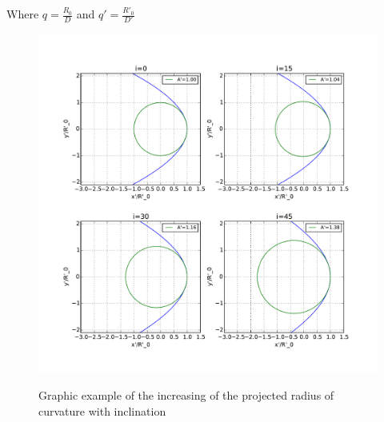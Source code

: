 Where $q=\frac{R_0}{D}$ and $q' = \frac{R'_0}{D'}$
\begin{figure}
\includegraphics[width=\linewidth]{conic2}
\label{fig:conic2}
\caption{Graphic example of the increasing of the projected radius of curvature with inclination}
\end{figure}


